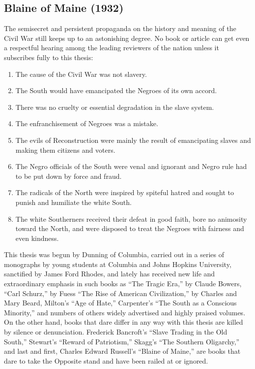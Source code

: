 \documentclass[letterpaper,10pt,english]{jupyterBook}
\begin{document}
\subsection{Blaine of Maine (1932)}
\label{\detokenize{Volumes/39/08/blaine_of_maine:blaine-of-maine-1932}}\label{\detokenize{Volumes/39/08/blaine_of_maine::doc}}
\sphinxAtStartPar
The semi\sphinxhyphen{}secret and persistent propaganda on the history and meaning of the Civil War still keeps up to an astonishing degree. No book or article can get even a respectful hearing among the leading reviewers of the nation unless it subscribes fully to this thesis:
\begin{enumerate}
%
\item {} 
\sphinxAtStartPar
The cause of the Civil War was not slavery.

\item {} 
\sphinxAtStartPar
The South would have emancipated the Negroes of its own accord.

\item {} 
\sphinxAtStartPar
There was no cruelty or essential degradation in the slave system.

\item {} 
\sphinxAtStartPar
The enfranchisement of Negroes was a mistake.

\item {} 
\sphinxAtStartPar
The evils of Reconstruction were mainly the result of emancipating slaves and making them citizens and voters.

\item {} 
\sphinxAtStartPar
The Negro officials of the South were venal and ignorant and Negro rule had to be put down by force and fraud.

\item {} 
\sphinxAtStartPar
The radicals of the North were inspired by spiteful hatred and sought to punish and humiliate the white South.

\item {} 
\sphinxAtStartPar
The white Southerners received their defeat in good faith, bore no animosity toward the North, and were disposed to treat the Negroes with fairness and even kindness.

\end{enumerate}

\sphinxAtStartPar
This thesis was begun by Dunning of Columbia, carried out in a series of monographs by young students at Columbia and Johns Hopkins University, sanctified by James Ford Rhodes, and lately has received new life and extraordinary emphasis in such books as “The Tragic Era,” by Claude Bowers, “Carl Schurz,” by Fuess “The Rise of American Civilization,” by Charles and Mary Beard, Milton’s “Age of Hate,” Carpenter’s “The South as a Conscious Minority,” and numbers of others widely advertised and highly praised volumes. On the other hand, books that dare differ in any way with this thesis are killed by silence or denunciation.  Frederick Bancroft’s “Slave Trading in the Old South,” Stewart’s “Reward of Patriotism,” Skagg’s “The Southern Oligarchy,” and last and first, Charles Edward Russell’s “Blaine of Maine,” are books that dare to take the Opposite stand and have been railed at or ignored.
\end{document}
